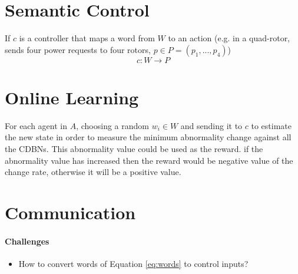 \documentclass{article}
\begin{document}
	\section{Semantic Control} 
	If $c$ is a controller that maps a word from $W$ to an action (e.g. in a quad-rotor, sends four power requests to four rotors, $p \in P  = (p_1,...,p_4)$)
	\begin{equation}
	c: W \longrightarrow P
	\end{equation}
	
	\section{Online Learning} For each agent in $A$, choosing a random $w_i \in W$ and sending it to $c$ to estimate the new state in order to measure the minimum abnormality change against all the CDBNs. This abnormality value could be used as the reward. if the abnormality value has increased then the reward would be negative value of the change rate, otherwise it will be a positive value.
	
	
	\section{Communication}
	
	
	\paragraph{Challenges}
		\begin{itemize}
			\item How to convert words of Equation  \ref{eq:words} to control inputs?
		\end{itemize}
	
	
	
\end{document}
